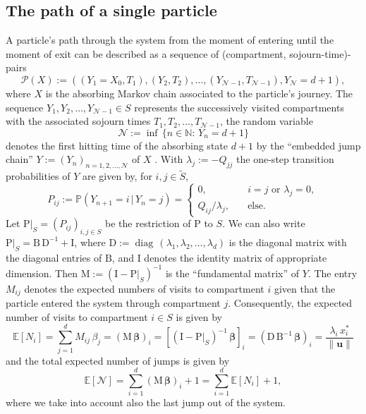 \documentclass[smallextended]{svjour3}
\renewcommand{\tens}[1]{\mathrm{#1}}
\renewcommand{\vec}[1]{\mathbf{#1}}
\newcommand{\N}{\mathbb{N}}
\renewcommand{\P}{\mathbb{P}}
\newcommand{\E}{\mathbb{E}}
\newcommand{\suml}{\sum\limits}
\newcommand{\vnorms}[1]{\|#1\|}
\newcommand{\diag}{\operatorname{diag}}
\renewcommand{\emph}[1]{``#1''}
\begin{document}
\subsection{The path of a single particle}
A particle's path through the system from the moment of entering until the moment of exit can be described as a sequence of (compartment, sojourn-time)-pairs
\begin{equation}
  \label{eqn:path}
  \mathcal{P}(X) := ((Y_1=X_0, T_1),(Y_2,T_2),\ldots,(Y_{\mathcal{N}-1},T_{\mathcal{N}-1}), Y_{\mathcal{N}}=d+1),
\end{equation}
where $X$ is the absorbing Markov chain associated to the particle's journey.
The sequence $Y_1,Y_2,\ldots,Y_{\mathcal{N}-1}\in S$ represents the successively visited compartments  with the associated sojourn times $T_1,T_2,\ldots,T_{\mathcal{N}-1}$, the random variable
\begin{equation}
  \mathcal{N}:=\inf\,\{n\in\N:\,Y_n=d+1\}
\end{equation}
denotes the first hitting time of the absorbing state $d+1$ by the \emph{embedded jump chain} $Y:=(Y_n)_{n=1,2,\ldots,\mathcal{N}}$ of $X$ \citep{Norris1997}.
With $\lambda_j:=-Q_{jj}$ the one-step transition probabilities of $Y$ are given by, for $i,j\in\widetilde{S}$,
\begin{equation}\label{eqn:P_ij}
  P_{ij}:=\P(Y_{n+1}=i\,|\,Y_n=j) = 
  \begin{cases}
    0,\quad & i=j\text{ or }\lambda_j=0,\\
    Q_{ij}/\lambda_j,\quad & \text{else}.
  \end{cases}
\end{equation}
Let $\tens{P}|_S=(P_{ij})_{i,j\in S}$ be the restriction of $\tens{P}$ to $S$.
We can also write $\tens{P}|_S = \tens{B}\,\tens{D}^{-1} + \tens{I}$, where $\tens{D}:= \diag\,(\lambda_1,\lambda_2,\ldots,\lambda_d)$ is the diagonal matrix with the diagonal entries of $\tens{B}$, and $\tens{I}$ denotes the identity matrix of appropriate dimension.
Then $\tens{M}:=(\tens{I}-\tens{P}|_S)^{-1}$ is the \emph{fundamental matrix} of $Y$.
The entry $M_{ij}$ denotes the expected numbers of visits to compartment $i$ given that the particle entered the system through compartment $j$.
Consequently, the expected number of visits to compartment $i\in S$ is given by 
\begin{equation}
  \label{eqn:N_i}
  \E\left[N_i\right] = \suml_{j=1}^d M_{ij}\,\beta_j = (\tens{M}\,\vec{\beta})_i = \left[(\tens{I}-\tens{P}|_S)^{-1}\,\vec{\beta}\right]_i 
  = (\tens{D}\,\tens{B}^{-1}\,\vec{\beta})_i
  = \frac{\lambda_i\,x^\ast_i}{\vnorms{\vec{u}}}
\end{equation}
and the total expected number of jumps is given by
\begin{equation}
  \E\left[\mathcal{N}\right] = \suml_{i=1}^d (\tens{M}\,\vec{\beta})_i+1= \suml_{i=1}^d \E\left[N_i\right]+1,
\end{equation}
where we take into account also the last jump out of the system.
\end{document}
